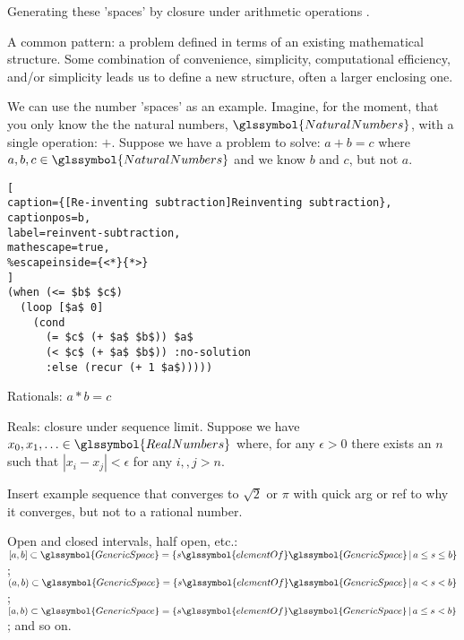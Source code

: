 Generating these 'spaces' by closure under arithmetic operations
\cite{PickertGorke:1974:RealNumbers}.

A common pattern: a problem defined in terms of an existing mathematical
structure. Some combination of convenience, simplicity, computational
efficiency, and/or simplicity leads us to define a new structure, 
often a larger enclosing one.

We can use the number 'spaces' as an example.
Imagine, for the moment, that you only know the 
the natural numbers, $\glssymbol{NaturalNumbers}$, with a single operation: $+$.
Suppose we have a problem to solve:
\begin{math}
a + b = c
\end{math}
where $a,b,c\in \glssymbol{NaturalNumbers}$ and we know $b$ and $c$,
but not $a$.

\begin{lstlisting}[
caption={[Re-inventing subtraction]Reinventing subtraction},
captionpos=b,
label=reinvent-subtraction,
mathescape=true,
%escapeinside={<*}{*>}
] 
(when (<= $b$ $c$)
  (loop [$a$ 0]
    (cond 
      (= $c$ (+ $a$ $b$)) $a$
      (< $c$ (+ $a$ $b$)) :no-solution
      :else (recur (+ 1 $a$)))))
\end{lstlisting}

Rationals: 
\begin{math}
a * b = c
\end{math}

Reals: closure under sequence limit.
Suppose we have $x_0, x_1, \ldots \in \glssymbol{RealNumbers}$
where, for any $\epsilon>0$ there exists an $n$ such that
$|x_i - x_j| < \epsilon$ for any $i,, j > n$.

Insert example sequence that converges to $\sqrt{2}$ or $\pi$
with quick arg or ref to why it converges, but not to a rational
number.


Open and closed intervals, half open, etc.:
$[a,b] \subset \glssymbol{GenericSpace} = 
\SetSpec{s \glssymbol{elementOf} \glssymbol{GenericSpace}}
{a \leq s \leq b}$;
$(a,b) \subset \glssymbol{GenericSpace} = 
\SetSpec{s \glssymbol{elementOf} \glssymbol{GenericSpace}}
{a < s < b}$;
$[a,b) \subset \glssymbol{GenericSpace} = 
\SetSpec{s \glssymbol{elementOf} \glssymbol{GenericSpace}}
{a \leq s < b}$;
and so on.

